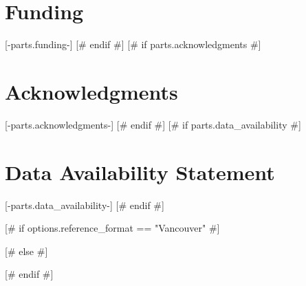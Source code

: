 \documentclass[utf8]{FrontiersinVancouver} %
[# else #]
\begin{document}
\section*{Funding}
[-parts.funding-]
[# endif #]
[# if parts.acknowledgments #]
\section*{Acknowledgments}
[-parts.acknowledgments-]
[# endif #]
[# if parts.data_availability #]
\section*{Data Availability Statement}
[-parts.data_availability-]
[# endif #]

[# if options.reference_format == "Vancouver" #]

% 
[# else #]

% 
[# endif #]



\end{document}
